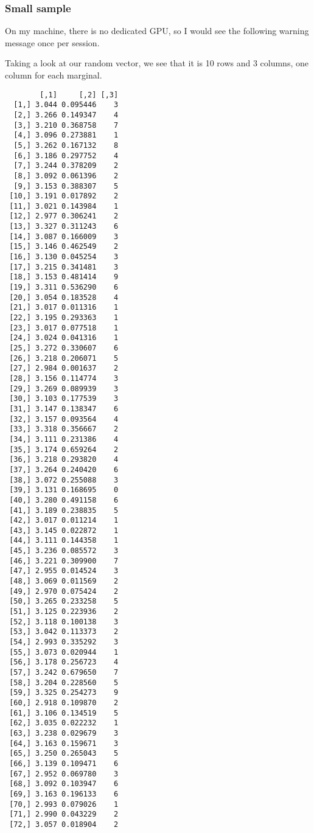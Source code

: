 \documentclass[
]{article}
\begin{document}
\hypertarget{small-sample}{%
\subsubsection{Small sample}\label{small-sample}}

On my machine, there is no dedicated GPU, so I would see the following warning message once per session.

Taking a look at our random vector, we see that it is 10 rows and 3 columns, one column for each marginal.

\begin{verbatim}
        [,1]     [,2] [,3]
  [1,] 3.044 0.095446    3
  [2,] 3.266 0.149347    4
  [3,] 3.210 0.368758    7
  [4,] 3.096 0.273881    1
  [5,] 3.262 0.167132    8
  [6,] 3.186 0.297752    4
  [7,] 3.244 0.378209    2
  [8,] 3.092 0.061396    2
  [9,] 3.153 0.388307    5
 [10,] 3.191 0.017892    2
 [11,] 3.021 0.143984    1
 [12,] 2.977 0.306241    2
 [13,] 3.327 0.311243    6
 [14,] 3.087 0.166009    3
 [15,] 3.146 0.462549    2
 [16,] 3.130 0.045254    3
 [17,] 3.215 0.341481    3
 [18,] 3.153 0.481414    9
 [19,] 3.311 0.536290    6
 [20,] 3.054 0.183528    4
 [21,] 3.017 0.011316    1
 [22,] 3.195 0.293363    1
 [23,] 3.017 0.077518    1
 [24,] 3.024 0.041316    1
 [25,] 3.272 0.330607    6
 [26,] 3.218 0.206071    5
 [27,] 2.984 0.001637    2
 [28,] 3.156 0.114774    3
 [29,] 3.269 0.089939    3
 [30,] 3.103 0.177539    3
 [31,] 3.147 0.138347    6
 [32,] 3.157 0.093564    4
 [33,] 3.318 0.356667    2
 [34,] 3.111 0.231386    4
 [35,] 3.174 0.659264    2
 [36,] 3.218 0.293820    4
 [37,] 3.264 0.240420    6
 [38,] 3.072 0.255088    3
 [39,] 3.131 0.168695    0
 [40,] 3.280 0.491158    6
 [41,] 3.189 0.238835    5
 [42,] 3.017 0.011214    1
 [43,] 3.145 0.022872    1
 [44,] 3.111 0.144358    1
 [45,] 3.236 0.085572    3
 [46,] 3.221 0.309900    7
 [47,] 2.955 0.014524    3
 [48,] 3.069 0.011569    2
 [49,] 2.970 0.075424    2
 [50,] 3.265 0.233258    5
 [51,] 3.125 0.223936    2
 [52,] 3.118 0.100138    3
 [53,] 3.042 0.113373    2
 [54,] 2.993 0.335292    3
 [55,] 3.073 0.020944    1
 [56,] 3.178 0.256723    4
 [57,] 3.242 0.679650    7
 [58,] 3.204 0.228560    5
 [59,] 3.325 0.254273    9
 [60,] 2.918 0.109870    2
 [61,] 3.106 0.134519    5
 [62,] 3.035 0.022232    1
 [63,] 3.238 0.029679    3
 [64,] 3.163 0.159671    3
 [65,] 3.250 0.265043    5
 [66,] 3.139 0.109471    6
 [67,] 2.952 0.069780    3
 [68,] 3.092 0.103947    6
 [69,] 3.163 0.196133    6
 [70,] 2.993 0.079026    1
 [71,] 2.990 0.043229    2
 [72,] 3.057 0.018904    2

\end{verbatim}
\end{document}
